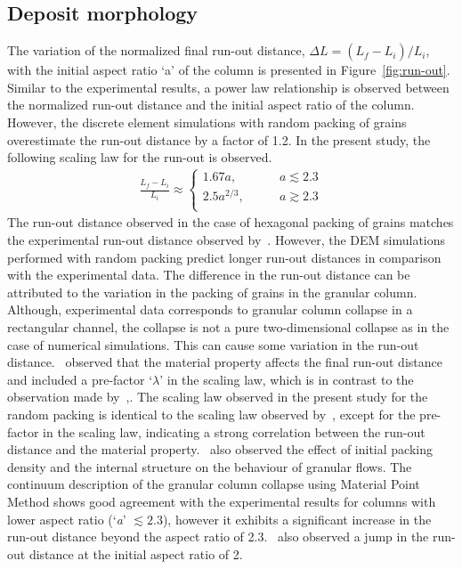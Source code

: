 \subsection{Deposit morphology}
The variation of the normalized final run-out distance, $\Delta L = 
(L_{\textit{f}}-L_{\textit{i}})/L_{\textit{i}}$, with the initial aspect ratio 
`a' of the column is presented in Figure~\ref{fig:run-out}. Similar to the 
experimental results, a power law relationship is observed between the 
normalized run-out distance and the initial aspect ratio of the column. 
However, the discrete element simulations with random packing of grains 
overestimate the run-out distance by a factor of 1.2. In the present study, the 
following scaling law for the run-out is observed.
\begin{align}
\frac{L_{\textit{f}}-L_{\textit{i}}}{L_{\textit{i}}} \approx  
\begin{cases}
1.67 a, &\qquad \textit{a}\lesssim 2.3 \\
2.5 a^{2/3}, &\qquad \textit{a} \gtrsim 2.3 \\
\end{cases}
\end{align}
The run-out distance observed in the case of hexagonal packing of grains 
matches the experimental run-out distance observed by~\citet{Lajeunesse2004}. 
However, the DEM simulations performed with random packing 
predict longer run-out distances in comparison with the experimental data. The 
difference in the run-out distance can be attributed to the variation in the 
packing of grains in the granular column. Although, experimental data 
corresponds to granular column collapse in a rectangular channel, the collapse 
is not a pure two-dimensional collapse as in the case of numerical simulations. 
This can cause some variation in the run-out distance.~\citet{Balmforth2005} 
observed that the material property affects the final run-out distance and 
included a pre-factor `$\lambda$' in the scaling law, which is in contrast to 
the observation made by~\citet{Lube2005},. The scaling law observed in the 
present study for the random packing is identical to the scaling law observed 
by~\citet{Lajeunesse2004}, except for the pre-factor in the scaling law, 
indicating a strong correlation between the run-out distance and the material 
property.~\citet{Daerr1999} also observed the effect of initial packing density 
and the internal structure on the behaviour of granular flows. The continuum 
description of the granular column collapse using Material Point Method shows 
good agreement with the experimental results for columns with lower aspect 
ratio (`\textit{a}' $\lesssim 2.3$), however it exhibits a significant increase 
in the run-out distance beyond the aspect ratio of 2.3.~\citet{Bandara2013} 
also observed a jump in the run-out distance at the initial aspect ratio of 2.

